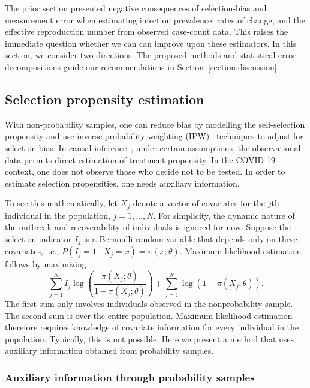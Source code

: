 \documentclass[11pt]{amsart}
\numberwithin{equation}{section}
\theoremstyle{plain}
\begin{document}
The prior section presented negative consequences of selection-bias and measurement error when estimating infection prevalence, rates of change, and the effective reproduction number from observed case-count data.  This raises the immediate question whether we can can improve upon these estimators.  In this section, we consider two directions.
The proposed methods and statistical error decompositions guide our recommendations in Section~\ref{section:discussion}.

\subsection{Selection propensity estimation}

With non-probability samples, one can reduce bias by modelling the self-selection propensity and use inverse probability weighting (IPW)~\citep{Elliott2017} techniques to adjust for selection bias.  In causal inference~\citep{Hernan2020}, under certain assumptions, the observational data permits direct estimation of treatment propensity.  In the COVID-19 context, one does not observe those who decide not to be tested.  In order to estimate selection propensities, one needs auxiliary information.

To see this mathematically, let $X_j$ denote a vector of covariates for the $j$th individual in the population, $j=1,\ldots,N$.  For simplicity, the dynamic nature of the outbreak and recoverability of individuals is ignored for now. Suppose the selection indicator $I_j$ is a Bernoulli random variable that depends only on these covariates, i.e., $P(I_j = 1 \mid X_j = x) = \pi (x; \theta)$. Maximum likelihood estimation follows by maximizing
\begin{equation}
\label{eq:propensity}
\sum_{j=1}^N I_j \log \left( \frac{\pi (X_j; \theta)}{1-\pi(X_j; \theta)} \right) + \sum_{j=1}^N \log \left( 1 - \pi (X_j; \theta) \right).
\end{equation}
The first sum only involves individuals observed in the nonprobability sample.
The second sum is over the entire population.  Maximum likelihood estimation therefore requires knowledge of covariate information for every individual in the population.  Typically, this is not possible.  Here we present a method that uses auxiliary information obtained from probability samples.

\subsubsection{Auxiliary information through probability samples}
\label{subsec:auxprob}
\end{document}
